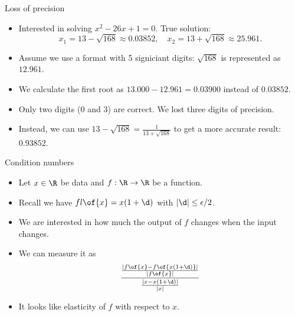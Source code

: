 \documentclass[11pt,xcolor={dvipsnames},aspectratio=159,hyperref={pdftex,pdfpagemode=UseNone,hidelinks,pdfdisplaydoctitle=true},usepdftitle=false]{beamer}
\begin{document}
\begin{frame}{Loss of precision}
    \begin{itemize}

     \item Interested in solving $x^2 -26x + 1 = 0$. True solution: $$x_1 = 13 - \sqrt{168}\approx 0.03852, \quad x_2 = 13 + \sqrt{168} \approx 25.961. $$
     \item Assume we use a format  with 5 signiciant digits: $\sqrt{168}$ is represented as $12.961$.
     \item We calculate the first root as $13.000 - 12.961 = 0.03900$ instead of $0.03852$. 
     \item Only two digits (0 and 3) are correct. We lost three digits of precision.
     \item Instead, we can use $13-\sqrt{168} = 
      \frac{1}{13+\sqrt{168}}$ to get a more accurate result: $0.93852$. 
    \end{itemize}
\end{frame}

\begin{frame}{Condition numbers}
    \begin{itemize}
     \item Let $x\in \R$ be data and $f:\R\rightarrow\R$ be a function. 
     \item Recall we have $fl\of{x} = x(1 + \d)$ with $|\d| \leq \epsilon \slash 2$.
     \item We are interested in how much the output of $f$ changes when the input changes.
     \item We can measure it as \begin{align*}
        \frac{\frac{|f\of{x} - f\of{x(1 + \d)}|}{|f\of{x}|}}{\frac{|x-x(1+\d)|}{|x|}} 
    \end{align*}
    \item It looks like elasticity of $f$ with respect to $x$.
    \end{itemize}
\end{frame}
\end{document}
